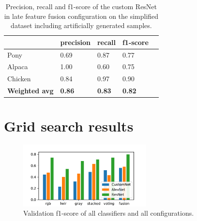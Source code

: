 \documentclass{l4proj}
\begin{document}
\begin{appendices}
\begin{table}[H]
  \centering
  \begin{tabular}{@{}lllll@{}}
  \toprule
                        & \textbf{precision} & \textbf{recall} & \textbf{f1-score} &  \\ \midrule
  Pony                  & 0.69               & 0.87            & 0.77              &  \\
  Alpaca                & 1.00               & 0.60            & 0.75              &  \\
  Chicken               & 0.84               & 0.97            & 0.90              &  \\
  \midrule
  \textbf{Weighted avg} & \textbf{0.86}      & \textbf{0.83}   & \textbf{0.82}     &  \\ \bottomrule
  \end{tabular}
  \caption{Precision, recall and f1-score of the custom ResNet in late feature fusion configuration on the simplified dataset including artificially generated samples.}
  \label{table:auto_scores_auto}
\end{table}


\chapter{Grid search results}
\label{appendix_grid_search}

\begin{figure}[ht]
  \centering
  \includegraphics[width=0.6\textwidth]{images/evaluation/gridsearch/comparison}
  \caption{Validation f1-score of all classifiers and all configurations.}
  \label{fig:gridsearch_bar}
\end{figure}


\end{appendices}
\end{document}
